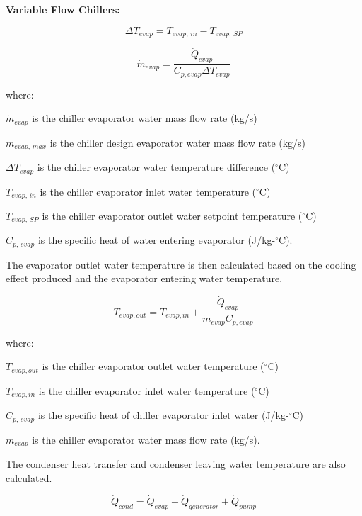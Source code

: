 \textbf{Variable Flow Chillers:}

\begin{equation}
\Delta {T_{evap}} = {T_{evap,\,in}} - {T_{evap,\,SP}}
\end{equation}

\begin{equation}
  \dot m_{evap} = \frac{\dot{Q}_{evap}}{C_{p,evap}\Delta T_{evap}}
\end{equation}

where:

\({\dot m_{evap}}\) is the chiller evaporator water mass flow rate (kg/s)

\({\dot m_{evap,\,max}}\) is the chiller design evaporator water mass flow rate (kg/s)

\(\Delta {T_{evap}}\) is the chiller evaporator water temperature difference (\(^{\circ}\)C)

\({T_{evap,\,in}}\) is the chiller evaporator inlet water temperature (\(^{\circ}\)C)

\({T_{evap,\,SP}}\) is the chiller evaporator outlet water setpoint temperature (\(^{\circ}\)C)

\({C_{p,\,evap}}\) is the specific heat of water entering evaporator (J/kg-\(^{\circ}\)C).

The evaporator outlet water temperature is then calculated based on the cooling effect produced and the evaporator entering water temperature.

\begin{equation}
  T_{evap,out} = T_{evap,in} + \frac{\dot{Q}_{evap}}{\dot{m}_{evap}C_{p,evap}}
\end{equation}

where:

\({T_{evap,out}}\) is the chiller evaporator outlet water temperature (\(^{\circ}\)C)

\({T_{evap,in}}\) is the chiller evaporator inlet water temperature (\(^{\circ}\)C)

\({C_{p,\,evap}}\) is the specific heat of chiller evaporator inlet water (J/kg-\(^{\circ}\)C)

\({\dot m_{evap}}\) is the chiller evaporator water mass flow rate (kg/s).

The condenser heat transfer and condenser leaving water temperature are also calculated.

\begin{equation}
{\dot Q_{cond}} = {\dot Q_{evap}} + {\dot Q_{generator}} + {\dot Q_{pump}}
\end{equation}

